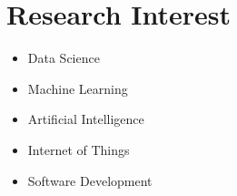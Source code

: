 \section{\textbf{Research Interest}}
\begin{itemize}[leftmargin=*,itemsep=2pt,parsep=0pt]
    \item Data Science
    \item Machine Learning
    \item Artificial Intelligence
    \item Internet of Things
    \item Software Development
\end{itemize}
